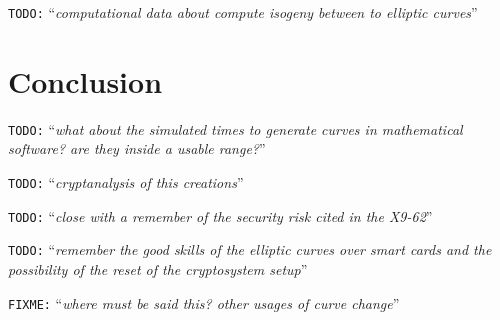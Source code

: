 \documentclass[10pt,a4paper,twoside]{llncs}
\newcommand{\todo}[1]{\texttt{\color{red}TODO:} ``\emph{#1}''}
\newcommand{\fixme}[1]{\texttt{\color{red}FIXME:} ``\emph{#1}''}
\begin{document}
\todo{computational data about compute isogeny between to elliptic curves}

\section{Conclusion \label{sec:conclusion}}
\todo{what about the simulated times to generate curves in mathematical software? are they inside a usable range?}

\todo{cryptanalysis of this creations}

\todo{close with a remember of the security risk cited in the X9-62}

\todo{remember the good skills of the elliptic curves over smart cards and the possibility of the reset of the cryptosystem setup}


\fixme{where must be said this? other usages of curve change}





\end{document}
